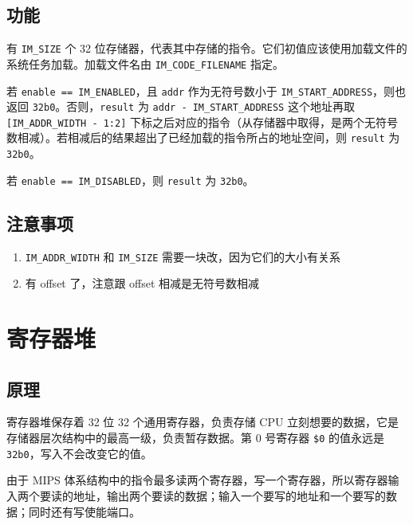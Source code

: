 \documentclass[12pt,AutoFakeBold]{article}
\providecommand{\tightlist}{%
  \setlength{\itemsep}{0pt}\setlength{\parskip}{0pt}}
\begin{document}
\hypertarget{ux529fux80fd-3}{%
\subsection{功能}\label{ux529fux80fd-3}}

有 \texttt{IM\_SIZE} 个 32 位存储器，代表其中存储的指令。它们初值应该使用加载文件的系统任务加载。加载文件名由 \texttt{IM\_CODE\_FILENAME} 指定。 

若 \texttt{enable\ ==\ IM\_ENABLED}，且 \texttt{addr} 作为无符号数小于
\texttt{IM\_START\_ADDRESS}，则也返回
\texttt{32\textquotesingle{}b0}。否则，\texttt{result} 为
\texttt{addr\ -\ IM\_START\_ADDRESS} 这个地址再取
\texttt{{[}IM\_ADDR\_WIDTH\ -\ 1:2{]}}
下标之后对应的指令（从存储器中取得，是两个无符号数相减）。若相减后的结果超出了已经加载的指令所占的地址空间，则
\texttt{result} 为 \texttt{32\textquotesingle{}b0}。

若 \texttt{enable\ ==\ IM\_DISABLED}，则 \texttt{result} 为
\texttt{32\textquotesingle{}b0}。

\hypertarget{ux6ce8ux610fux4e8bux9879-2}{%
\subsection{注意事项}\label{ux6ce8ux610fux4e8bux9879-2}}

\begin{enumerate}
\def\labelenumi{\arabic{enumi}.}
\tightlist
\item
  \texttt{IM\_ADDR\_WIDTH} 和 \texttt{IM\_SIZE}
  需要一块改，因为它们的大小有关系
\item
  有 offset 了，注意跟 offset 相减是无符号数相减
\end{enumerate}

\hypertarget{ux5bc4ux5b58ux5668ux5806}{%
\section{寄存器堆}\label{ux5bc4ux5b58ux5668ux5806}}

\hypertarget{ux539fux7406-2}{%
\subsection{原理}\label{ux539fux7406-2}}

寄存器堆保存着 32 位 32 个通用寄存器，负责存储 CPU
立刻想要的数据，它是存储器层次结构中的最高一级，负责暂存数据。第 0
号寄存器 \texttt{\$0} 的值永远是
\texttt{32\textquotesingle{}b0}，写入不会改变它的值。

由于 MIPS 体系结构中的指令最多读两个寄存器，写一个寄存器，所以寄存器输入两个要读的地址，输出两个要读的数据；输入一个要写的地址和一个要写的数据；同时还有写使能端口。
\end{document}
